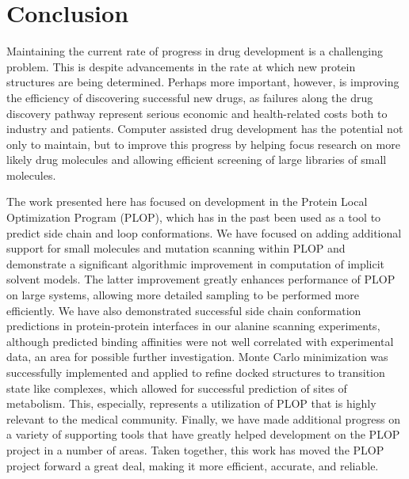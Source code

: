 \section{Conclusion}
\label{section:unsorted/conclusion}

Maintaining the current rate of progress in drug development is a challenging problem.
This is despite advancements in the rate at which new protein structures are being determined.
Perhaps more important, however, is improving the efficiency of discovering successful new drugs, as failures along the drug discovery pathway represent serious economic and health-related costs both to industry and patients.
Computer assisted drug development has the potential not only to maintain, but to improve this progress by helping focus research on more likely drug molecules and allowing efficient screening of large libraries of small molecules. 

The work presented here has focused on development in the Protein Local Optimization Program (PLOP), which has in the past been used as a tool to predict side chain and loop conformations.
We have focused on adding additional support for small molecules and mutation scanning within PLOP and demonstrate a significant algorithmic improvement in computation of implicit solvent models.
The latter improvement greatly enhances performance of PLOP on large systems, allowing more detailed sampling to be performed more efficiently.
We have also demonstrated successful side chain conformation predictions in protein-protein interfaces in our alanine scanning experiments, although predicted binding affinities were not well correlated with experimental data, an area for possible further investigation.
Monte Carlo minimization was successfully implemented and applied to refine docked structures to transition state like complexes, which allowed for successful prediction of sites of metabolism.
This, especially, represents a utilization of PLOP that is highly relevant to the medical community.
Finally, we have made additional progress on a variety of supporting tools that have greatly helped development on the PLOP project in a number of areas.
Taken together, this work has moved the PLOP project forward a great deal, making it more efficient, accurate, and reliable.
